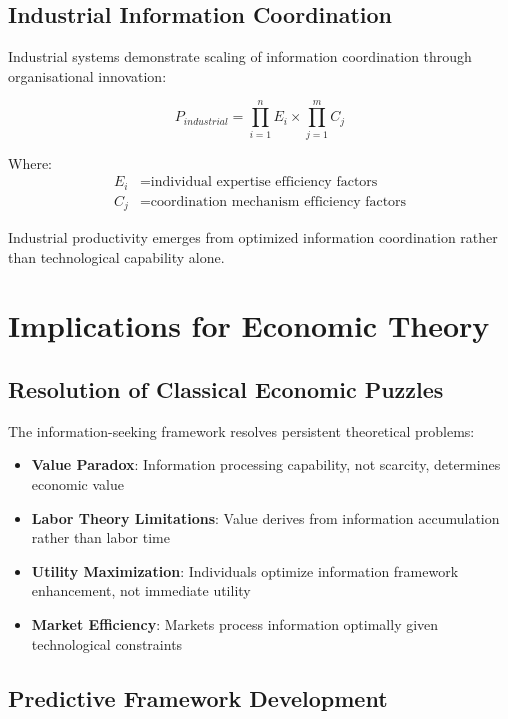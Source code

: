 \documentclass[12pt,a4paper]{article}
\begin{document}
\subsection{Industrial Information Coordination}

Industrial systems demonstrate scaling of information coordination through organisational innovation:

\begin{equation}
P_{industrial} = \prod_{i=1}^{n} E_i \times \prod_{j=1}^{m} C_j
\end{equation}

Where:
\begin{align}
E_i &= \text{individual expertise efficiency factors} \\
C_j &= \text{coordination mechanism efficiency factors}
\end{align}

Industrial productivity emerges from optimized information coordination rather than technological capability alone.

\section{Implications for Economic Theory}

\subsection{Resolution of Classical Economic Puzzles}

The information-seeking framework resolves persistent theoretical problems:

\begin{itemize}
\item \textbf{Value Paradox}: Information processing capability, not scarcity, determines economic value
\item \textbf{Labor Theory Limitations}: Value derives from information accumulation rather than labor time
\item \textbf{Utility Maximization}: Individuals optimize information framework enhancement, not immediate utility
\item \textbf{Market Efficiency}: Markets process information optimally given technological constraints
\end{itemize}

\subsection{Predictive Framework Development}
\end{document}
